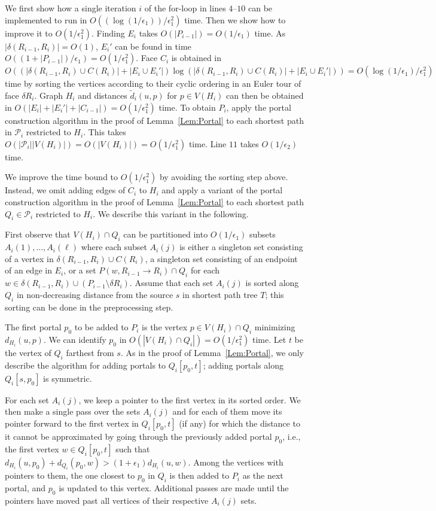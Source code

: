 \documentclass[11pt]{article}
\begin{document}
We first show how a single iteration $i$ of the for-loop in lines $4$--$10$ can be implemented to run in $O((\log(1/\epsilon_1))/\epsilon_1^2)$ time. Then we show how to improve it to $O(1/\epsilon_1^2)$. Finding $E_i$ takes $O(|P_{i-1}|) = O(1/\epsilon_1)$ time. As $|\delta(R_{i-1},R_i)| = O(1)$, $E_i'$ can be found in time $O((1 + |P_{i-1}|)/\epsilon_1) = O(1/\epsilon_1^2)$. Face $C_i$ is obtained in $O((|\delta(R_{i-1},R_i)\cup C(R_i)| + |E_i\cup E_i'|)\log(|\delta(R_{i-1},R_i)\cup C(R_i)| + |E_i\cup E_i'|)) = O(\log(1/\epsilon_1)/\epsilon_1^2)$ time by sorting the vertices according to their cyclic ordering in an Euler tour of face $\delta R_i$. Graph $H_i$ and distances $\tilde{d}_i(u,p)$ for $p\in V(H_i)$ can then be obtained in $O(|E_i| + |E_i'| + |C_{i-1}|) = O(1/\epsilon_1^2)$ time. To obtain $P_i$, apply the portal construction algorithm in the proof of Lemma~\ref{Lem:Portal} to each shortest path in $\mathcal P_i$ restricted to $H_i$. This takes $O(|\mathcal P_i||V(H_i)|) = O(|V(H_i)|) = O(1/\epsilon_1^2)$ time. Line $11$ takes $O(1/\epsilon_2)$ time.

We improve the time bound to $O(1/\epsilon_1^2)$ by avoiding the sorting step above. Instead, we omit adding edges of $C_i$ to $H_i$ and apply a variant of the portal construction algorithm in the proof of Lemma~\ref{Lem:Portal} to each shortest path $Q_i\in\mathcal P_i$ restricted to $H_i$. We describe this variant in the following.

First observe that $V(H_i)\cap Q_i$ can be partitioned into $O(1/\epsilon_1)$ subsets $A_i(1),\ldots,A_i(\ell)$ where each subset $A_i(j)$ is either a singleton set consisting of a vertex in $\delta(R_{i-1},R_i)\cup C(R_i)$, a singleton set consisting of an endpoint of an edge in $E_i$, or a set $P(w,R_{i-1}\rightarrow R_i)\cap Q_i$ for each $w\in\delta(R_{i-1},R_i)\cup (P_{i-1}\setminus\delta R_i)$. Assume that each set $A_i(j)$ is sorted along $Q_i$ in non-decreasing distance from the source $s$ in shortest path tree $T$; this sorting can be done in the preprocessing step.

The first portal $p_0$ to be added to $P_i$ is the vertex $p\in V(H_i)\cap Q_i$ minimizing $d_{H_i}(u,p)$. We can identify $p_0$ in $O(|V(H_i)\cap Q_i|) = O(1/\epsilon_1^2)$ time. Let $t$ be the vertex of $Q_i$ farthest from $s$. As in the proof of Lemma~\ref{Lem:Portal}, we only describe the algorithm for adding portals to $Q_i[p_0,t]$; adding portals along $Q_i[s,p_0]$ is symmetric.

For each set $A_i(j)$, we keep a pointer to the first vertex in its sorted order. We then make a single pass over the sets $A_i(j)$ and for each of them move its pointer forward to the first vertex in $Q_i[p_0,t]$ (if any) for which the distance to it cannot be approximated by going through the previously added portal $p_0$, i.e., the first vertex $w\in Q_i[p_0,t]$ such that $d_{H_i}(u,p_0) + d_{Q_i}(p_0,w) > (1+\epsilon_1)d_{H_i}(u,w)$. Among the vertices with pointers to them, the one closest to $p_0$ in $Q_i$ is then added to $P_i$ as the next portal, and $p_0$ is updated to this vertex. Additional passes are made until the pointers have moved past all vertices of their respective $A_i(j)$ sets.
\end{document}
